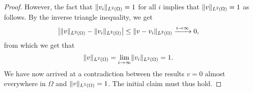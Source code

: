 \documentclass[english, 12pt, a4paper, sci, utf8, a-2b, online]{aaltothesis}
\theoremstyle{definition}
\theoremstyle{plain}
\DeclarePairedDelimiter\abs{\lvert}{\rvert}
\DeclarePairedDelimiter\norm{\lVert}{\rVert}
\numberwithin{equation}{section}
\begin{document}
\begin{proof}
    However, the fact that $\norm{v_i}_{L^2(\Omega)} = 1$ for all $i$
    implies that $\norm{v}_{L^2(\Omega)} = 1$ as follows. By the inverse
    triangle inequality, we get
    \begin{equation*}
        \abs*{\norm{v}_{L^2(\Omega)} - \norm{v_i}_{L^2(\Omega)}}
        \leq \norm{v - v_i}_{L^2(\Omega)}
        \xrightarrow[]{i \to \infty} 0,
    \end{equation*}
    from which we get that
    \begin{equation*}
        \norm{v}_{L^2(\Omega)}
        = \lim_{i \to \infty} \norm{v_i}_{L^2(\Omega)}
        = 1.
    \end{equation*}
    We have now arrived at a contradiction between the results $v = 0$
    almost everywhere in $\Omega$ and $\norm{v}_{L^2(\Omega)} = 1$.
    The initial claim must thus hold.
\end{proof}
\end{document}
